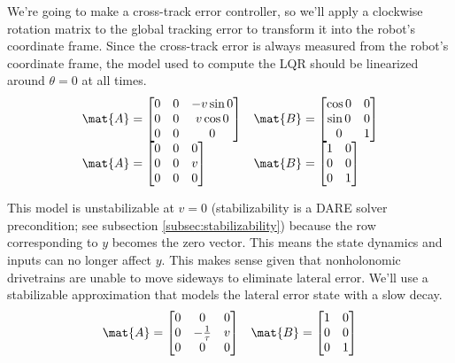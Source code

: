 We're going to make a cross-track error controller, so we'll apply a clockwise
rotation matrix to the global tracking error to transform it into the robot's
coordinate frame. Since the cross-track error is always measured from the
robot's coordinate frame, the \gls{model} used to compute the LQR should be
linearized around $\theta = 0$ at all times.
\begin{equation*}
  \begin{array}{ll}
    \mat{A} =
    \begin{bmatrix}
      0 & 0 & -v\sin 0 \\
      0 & 0 & v\cos 0 \\
      0 & 0 & 0
    \end{bmatrix} &
    \mat{B} =
    \begin{bmatrix}
      \cos 0 & 0 \\
      \sin 0 & 0 \\
      0 & 1
    \end{bmatrix} \\
    \mat{A} =
    \begin{bmatrix}
      0 & 0 & 0 \\
      0 & 0 & v \\
      0 & 0 & 0
    \end{bmatrix} &
    \mat{B} =
    \begin{bmatrix}
      1 & 0 \\
      0 & 0 \\
      0 & 1
    \end{bmatrix}
  \end{array}
\end{equation*}

This \gls{model} is unstabilizable at $v = 0$ (stabilizability is a DARE solver
precondition; see subsection \ref{subsec:stabilizability}) because the row
corresponding to $y$ becomes the zero vector. This means the state dynamics and
inputs can no longer affect $y$. This makes sense given that nonholonomic
drivetrains are unable to move sideways to eliminate lateral error. We'll use a
stabilizable approximation that models the lateral error state with a slow
decay.
\begin{equation*}
  \begin{array}{ll}
    \mat{A} =
    \begin{bmatrix}
      0 & 0 & 0 \\
      0 & -\frac{1}{\tau} & v \\
      0 & 0 & 0
    \end{bmatrix} &
    \mat{B} =
    \begin{bmatrix}
      1 & 0 \\
      0 & 0 \\
      0 & 1
    \end{bmatrix}
  \end{array}
\end{equation*}

